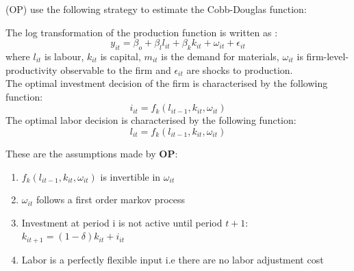 \documentclass[12pt]{article}
\begin{document}
 \textcite{olley1992dynamics} (OP) use the
following strategy to estimate the Cobb-Douglas function: 


The log transformation of the production function is written as : 
\begin{equation}
y_{it} = \beta_{o} + \beta_{l}l_{it} + \beta_{k}k_{it} + \omega_{it} + \epsilon_{it} 
\end{equation}
where $l_{it}$ is labour, $k_{it}$ is capital, $m_{it}$  is
the demand for materials, $\omega_{it}$ is firm-level-productivity
observable to the firm and $\epsilon_{it}$ are shocks to production.\\
The optimal investment decision of the firm is characterised by the following
function:
\begin{equation}
i_{it}= f_{k}(l_{it-1}, k_{it}, \omega_{it})
\end{equation}
The optimal labor decision is characterised by the following function:
\begin{equation}
l_{it}= f_{k}(l_{it-1}, k_{it}, \omega_{it})
\end{equation}

These are the assumptions made by \textbf{OP}:
\begin{enumerate}
\item $f_{k}(l_{it-1}, k_{it}, \omega_{it})$ is invertible in
  $\omega_{it}$
\item $\omega_{it}$ follows a first order markov process 
\item Investment at period i is not active until period $t+1$:
  $k_{it+1}= (1-\delta)k_{it} + i_{it}$
\item Labor is a perfectly flexible input i.e there are no labor
  adjustment cost
\end{enumerate}
\end{document}

